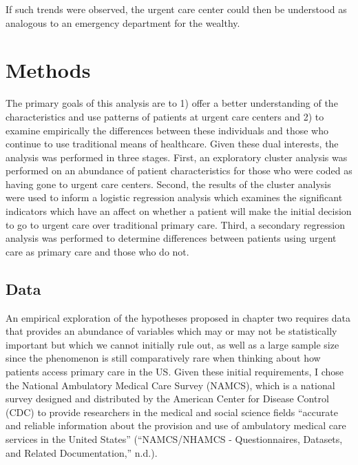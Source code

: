\documentclass[12pt,twoside]{reedthesis}
\begin{document}
  If such trends were observed, the urgent care center could then be
  understood as analogous to an emergency department for the wealthy.
  
  \doublespacing
  
  \chapter{Methods}\label{methods}
  
  The primary goals of this analysis are to 1) offer a better
  understanding of the characteristics and use patterns of patients at
  urgent care centers and 2) to examine empirically the differences
  between these individuals and those who continue to use traditional
  means of healthcare. Given these dual interests, the analysis was
  performed in three stages. First, an exploratory cluster analysis was
  performed on an abundance of patient characteristics for those who were
  coded as having gone to urgent care centers. Second, the results of the
  cluster analysis were used to inform a logistic regression analysis
  which examines the significant indicators which have an affect on
  whether a patient will make the initial decision to go to urgent care
  over traditional primary care. Third, a secondary regression analysis
  was performed to determine differences between patients using urgent
  care as primary care and those who do not.
  
  \section{Data}\label{data}
  
  An empirical exploration of the hypotheses proposed in chapter two
  requires data that provides an abundance of variables which may or may
  not be statistically important but which we cannot initially rule out,
  as well as a large sample size since the phenomenon is still
  comparatively rare when thinking about how patients access primary care
  in the US. Given these initial requirements, I chose the National
  Ambulatory Medical Care Survey (NAMCS), which is a national survey
  designed and distributed by the American Center for Disease Control
  (CDC) to provide researchers in the medical and social science fields
  ``accurate and reliable information about the provision and use of
  ambulatory medical care services in the United States'' (``NAMCS/NHAMCS
  - Questionnaires, Datasets, and Related Documentation,'' n.d.).
  
\end{document}
